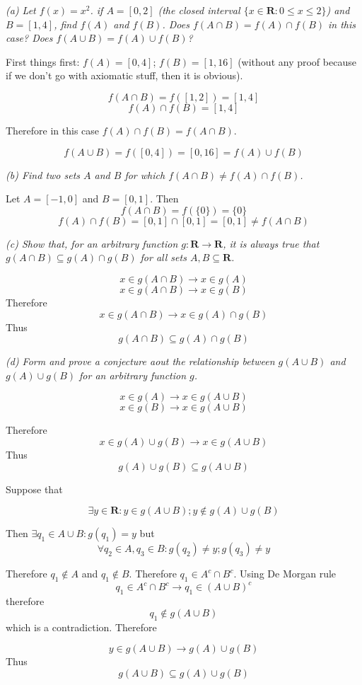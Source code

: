 \documentclass[11pt,oneside,titlepage]{article}
\begin{document}
\textit{(a) Let $f(x) = x^2$. if $A=[0,2]$ (the closed interval $\{x \in
  \textbf{R}: 0 \leq x \leq 2\}$) and $B=[1,4]$, find $f(A)$ and $f(B)$. Does
  $f (A \cap B) = f(A) \cap f(B)$ in this case? Does $f(A \cup B) = f(A) \cup
  f(B)$? }

First things first: $f(A) = [0, 4]$; $f(B) = [1, 16]$ (without any proof
because if we don't go with axiomatic stuff, then it is obvious).

$$f(A \cap B) = f([1, 2]) = [1, 4]$$
$$f(A) \cap f(B) = [1, 4]$$

Therefore in this case $f(A) \cap f(B) = f(A \cap B)$.

$$f(A \cup B) = f([0, 4]) = [0, 16] = f(A) \cup f(B)$$

\textit{(b) Find two sets $A$ and $B$ for which $f(A \cap B) \neq f(A) \cap f(B)$.}

Let $A = [-1, 0]$ and $B = [0, 1]$. Then
$$f(A \cap B) = f(\{0\}) = \{0\}$$
$$f(A) \cap f(B) = [0, 1] \cap [0, 1] = [0, 1] \neq f(A \cap B)$$

\textit{(c) Show that, for an arbitrary function $g: \textbf{R} \to \textbf{R}$, it
  is always true that $g(A \cap B) \subseteq g(A) \cap g(B)$ for all sets
  $A,B \subseteq \textbf{R}$.}

$$x \in g(A \cap B) \to x \in g(A)$$
$$x \in g(A \cap B) \to x \in g(B)$$
Therefore
$$x \in g(A \cap B) \to x \in g(A) \cap g(B)$$
Thus
$$g(A \cap B) \subseteq g(A) \cap g(B)$$

\textit{(d) Form and prove a conjecture aout the relationship between $g(A \cup B)$ and $g(A) \cup g(B)$ for an arbitrary function $g$.}

$$x \in g(A) \to x \in g(A \cup B)$$
$$x \in g(B) \to x \in g(A \cup B)$$

Therefore
$$x \in g(A) \cup g(B) \to x \in g(A \cup B)$$
Thus
$$g(A) \cup g(B) \subseteq g(A \cup B)$$

Suppose that

$$\exists y \in \textbf{R}: y \in g(A \cup B); y \notin g(A) \cup g(B)$$

Then $\exists q_1 \in A \cup B: g(q_1) = y$ but
$$\forall q_2 \in A, q_3 \in B: g(q_2) \neq y; g(q_3) \neq y$$

Therefore $q_1 \notin A$ and $q_1 \notin B$. Therefore $q_1 \in A^c \cap B^c$.
Using De Morgan rule
$$q_1 \in A^c \cap B^c \to q_1 \in (A \cup B)^c$$
therefore 
$$q_1 \notin g(A \cup B)$$
which is a contradiction. Therefore

$$y \in g(A \cup B) \to g(A) \cup g(B)$$
Thus
$$g(A \cup B) \subseteq g(A) \cup g(B)$$
\end{document}
